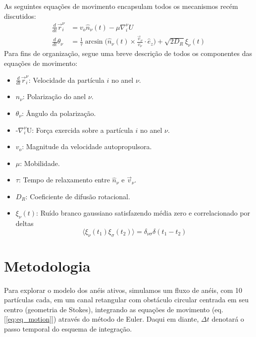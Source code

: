 \documentclass{article}
\theoremstyle{definition}
\def \quantity#1#2#3{\vec{#1}_{#2}^{#3}}
\def \pos#1#2{\quantity{r}{#1}{#2}}
\begin{document}
As seguintes equações de movimento encapsulam todos os mecanismos recém discutidos:
\begin{equation}
\begin{aligned}
\frac{d}{dt}\pos{i}{\nu} &= v_o \hat n_\nu(t) - \mu \nabla_i^\nu U \\
\frac{d}{dt}\theta_{\nu} &= \frac{1}{\tau}\arcsin\bigg(\hat n_\nu(t) \times \frac{\vec v_{\nu}}{v_{\nu}} \cdot \hat e_z \bigg) + \sqrt{2 D_R}\xi_\nu(t)
\end{aligned}
\label{eq:eq_motion}
\end{equation}
Para fins de organização, segue uma breve descrição de todos os componentes das equações de movimento:
\begin{itemize}
    \item $\frac{d}{dt}\pos{i}{\nu}$: Velocidade da partícula $i$ no anel $\nu$.
    \item $\hat n_\nu$: Polarização do anel $\nu$.
    \item $\theta_\nu$: Ângulo da polarização.
    \item -$\nabla_i^\nu$U: Força exercida sobre a partícula $i$ no anel $\nu$.
    \item $v_o$: Magnitude da velocidade autopropulsora. 
    \item $\mu$: Mobilidade. 
    \item $\tau$: Tempo de relaxamento entre $\hat n_\nu$ e $\vec v_\nu$. 
    \item $D_R$: Coeficiente de difusão rotacional.
    \item $\xi_\nu(t)$: Ruído branco gaussiano satisfazendo média zero e correlacionado por deltas
    $$\langle \xi_\nu(t_1) \xi_\sigma(t_2) \rangle = \delta_{\nu \sigma}\delta(t_1 - t_2)$$
\end{itemize}


\section{Metodologia}
\paragraph{}
Para explorar o modelo dos anéis ativos, simulamos um fluxo de anéis, com 10 partículas cada, em um canal retangular com obstáculo circular centrada em seu centro (geometria de Stokes), integrando as equações de movimento (eq. [\ref{eq:eq_motion}]) através do método de Euler.  Daqui em diante, $\Delta t$ denotará o passo temporal do esquema de integração.
\end{document}
